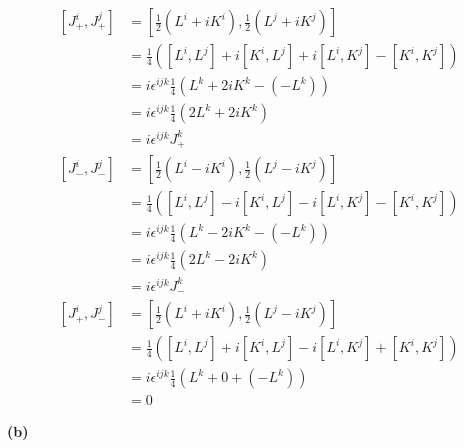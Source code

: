 \documentclass{article}
\begin{document}
\begin{align}
\left[J_{+}^{i} ,J_{+}^{j} \right] 
			&= \left[\frac{1}{2}(L^{i} + i K^{i}) ,\frac{1}{2}(L^{j} + i K^{j}) \right] \nonumber \\
			&= \frac{1}{4} (\left[ L^{i},L^{j} \right] + i\left[ K^{i},L^{j} \right] 
				+i\left[ L^{i},K^{j} \right] -\left[ K^{i},K^{j} \right]) \nonumber \\
			&=i \epsilon^{ijk} \frac{1}{4}(L^{k} + 2i K^{k} - (- L^{k})) \nonumber \\
			&=i  \epsilon^{ijk} \frac{1}{4}(2L^{k}+2iK^{k}) \nonumber \\
			&=i \epsilon^{ijk} J_{+}^{k}  \\ \nonumber
\left[J_{-}^{i} ,J_{-}^{j} \right] 
			&= \left[\frac{1}{2}(L^{i} - i K^{i}) ,\frac{1}{2}(L^{j} - i K^{j}) \right] \nonumber \\
			&= \frac{1}{4} (\left[ L^{i},L^{j} \right] - i\left[ K^{i},L^{j} \right] 
				-i\left[ L^{i},K^{j} \right] -\left[ K^{i},K^{j} \right]) \nonumber \\
			&=i \epsilon^{ijk} \frac{1}{4}(L^{k} - 2i K^{k}- (-L^{k})) \nonumber \\
			&=i  \epsilon^{ijk} \frac{1}{4}(2L^{k}-2iK^{k}) \nonumber \\
			&=i \epsilon^{ijk} J_{-}^{k} \\ \nonumber
\left[J_{+}^{i} ,J_{-}^{j} \right] 
			&= \left[\frac{1}{2}(L^{i} + i K^{i}) ,\frac{1}{2}(L^{j} - i K^{j}) \right] \nonumber \\
			&= \frac{1}{4} (\left[ L^{i},L^{j} \right] + i\left[ K^{i},L^{j} \right] 
				-i\left[ L^{i},K^{j} \right] +\left[ K^{i},K^{j} \right]) \nonumber \\
			&=i \epsilon^{ijk} \frac{1}{4}(L^{k} + 0 + (-L^{k})) \nonumber \\
			&=0\nonumber
\end{align}

\bf{(b)}
\end{document}
